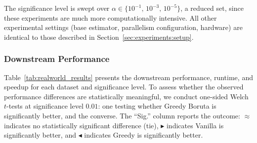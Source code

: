 \documentclass[runningheads]{llncs}
\begin{document}
 
The significance level is swept over $\alpha \in \{10^{-1},\, 10^{-3},\, 10^{-5}\}$, a reduced set, since  these experiments are much more computationally intensive. All other experimental settings (base estimator, parallelism configuration, hardware) are identical to those described in Section~\ref{sec:experiments:setup}.
 
\subsubsection{Downstream Performance}
\label{sec:experiments:realworld:performance}
 
Table~\ref{tab:realworld_results} presents the downstream performance, runtime, and speedup for each dataset and significance level. To assess whether the observed performance differences are statistically meaningful, we conduct one-sided Welch $t$-tests at significance level $0.01$: one testing whether Greedy Boruta is significantly better, and the converse. The ``Sig.'' column reports the outcome: $\approx$ indicates no statistically significant difference (tie), $\blacktriangleright$ indicates Vanilla is significantly better, and $\blacktriangleleft$ indicates Greedy is significantly better.
\end{document}
